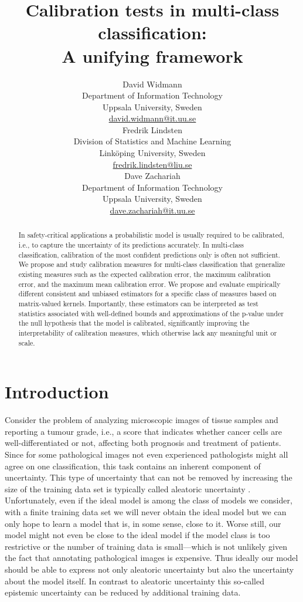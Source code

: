 \documentclass{article}
\title{Calibration tests in multi-class classification: \\ A unifying framework}
\author{%
  David Widmann \\
  Department of Information Technology \\
  Uppsala University, Sweden \\
  \url{david.widmann@it.uu.se} \\
  \And
  Fredrik Lindsten \\
  Division of Statistics and Machine Learning \\
  Linköping University, Sweden \\
  \url{fredrik.lindsten@liu.se} \\
  \AND
  Dave Zachariah \\
  Department of Information Technology \\
  Uppsala University, Sweden \\
  \url{dave.zachariah@it.uu.se} \\
}
\begin{document}
\maketitle

\begin{abstract}
    In safety-critical applications a probabilistic model is usually required to
    be calibrated, i.e., to capture the uncertainty of its predictions accurately.
    In multi-class classification, calibration of the most confident predictions
    only is often not sufficient. We propose and study calibration measures for
    multi-class classification that generalize existing measures such as the
    expected calibration error, the maximum calibration error, and the maximum
    mean calibration error. We propose and evaluate empirically different
    consistent and unbiased estimators for a specific class of measures based on
    matrix-valued kernels. Importantly, these estimators can be interpreted as
    test statistics associated with well-defined bounds and approximations of
    the p-value under the null hypothesis that the model is calibrated,
    significantly improving the interpretability of calibration measures, which
    otherwise lack any meaningful unit or scale.
\end{abstract}

\section{Introduction}

Consider the problem of analyzing microscopic images of tissue samples and
reporting a tumour grade, i.e., a score that indicates whether cancer cells are
well-differentiated or not, affecting both prognosis and treatment of patients.
Since for some pathological images not even experienced pathologists might all
agree on one classification, this task contains an inherent component of
uncertainty. This type of uncertainty that can not be removed by increasing the
size of the training data set is typically called aleatoric uncertainty
\citep{kiureghian09_aleat_or_epist}. Unfortunately, even if the ideal model is
among the class of models we consider, with a finite training data set we will
never obtain the ideal model but we can only hope to learn a model that is, in
some sense, close to it. Worse still, our model might not even be close to the
ideal model if the model class is too restrictive or the number of training data
is small---which is not unlikely given the fact that annotating pathological
images is expensive. Thus ideally our model should be able to express not only
aleatoric uncertainty but also the uncertainty about the model itself. In
contrast to aleatoric uncertainty this so-called epistemic uncertainty can be
reduced by additional training data.
\end{document}
